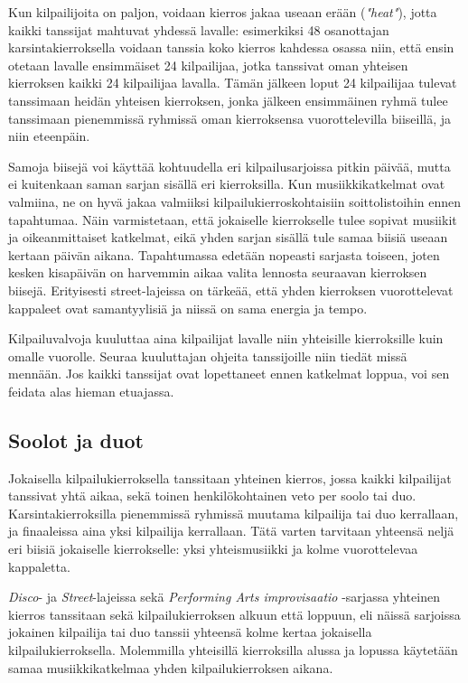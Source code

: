\documentclass[12pt, a4paper, oneside]{article}
\begin{document}
Kun kilpailijoita on paljon,
voidaan kierros jakaa useaan erään (\textit{"heat"}),
jotta kaikki tanssijat mahtuvat yhdessä lavalle: esimerkiksi 48 osanottajan karsintakierroksella voidaan tanssia koko kierros kahdessa osassa niin,
että ensin otetaan lavalle ensimmäiset 24 kilpailijaa,
jotka tanssivat oman yhteisen kierroksen kaikki 24 kilpailijaa lavalla.
Tämän jälkeen loput 24 kilpailijaa tulevat tanssimaan heidän yhteisen kierroksen,
jonka jälkeen ensimmäinen ryhmä tulee tanssimaan pienemmissä ryhmissä oman kierroksensa vuorottelevilla biiseillä,
ja niin eteenpäin.

Samoja biisejä voi käyttää kohtuudella eri kilpailusarjoissa pitkin päivää,
mutta ei kuitenkaan saman sarjan sisällä eri kierroksilla.
Kun musiikkikatkelmat ovat valmiina,
ne on hyvä jakaa valmiiksi kilpailukierroskohtaisiin soittolistoihin ennen tapahtumaa.
Näin varmistetaan,
että jokaiselle kierrokselle tulee sopivat musiikit ja oikeanmittaiset katkelmat,
eikä yhden sarjan sisällä tule samaa biisiä useaan kertaan päivän aikana.
Tapahtumassa edetään nopeasti sarjasta toiseen,
joten kesken kisapäivän on harvemmin aikaa valita lennosta seuraavan kierroksen biisejä.
Erityisesti street-lajeissa on tärkeää,
että yhden kierroksen vuorottelevat kappaleet ovat samantyylisiä ja niissä on sama energia ja tempo.

Kilpailuvalvoja kuuluttaa aina kilpailijat lavalle niin yhteisille kierroksille kuin omalle vuorolle.
Seuraa kuuluttajan ohjeita tanssijoille niin tiedät missä mennään.
Jos kaikki tanssijat ovat lopettaneet ennen katkelmat loppua,
voi sen feidata alas hieman etuajassa.

\subsection{Soolot ja duot} \label{subsec:soolot-ja-duot}

Jokaisella kilpailukierroksella tanssitaan yhteinen kierros,
jossa kaikki kilpailijat tanssivat yhtä aikaa,
sekä toinen henkilökohtainen veto per soolo tai duo.
Karsintakierroksilla pienemmissä ryhmissä muutama kilpailija tai duo kerrallaan,
ja finaaleissa aina yksi kilpailija kerrallaan.
Tätä varten tarvitaan yhteensä neljä eri biisiä jokaiselle kierrokselle:
yksi yhteismusiikki ja kolme vuorottelevaa kappaletta.

\textit{Disco}- ja \textit{Street}-lajeissa sekä \textit{Performing Arts improvisaatio} -sarjassa yhteinen kierros tanssitaan sekä kilpailukierroksen alkuun että loppuun,
eli näissä sarjoissa jokainen kilpailija tai duo tanssii yhteensä kolme kertaa jokaisella kilpailukierroksella.
Molemmilla yhteisillä kierroksilla alussa ja lopussa käytetään samaa musiikkikatkelmaa yhden kilpailukierroksen aikana.
\end{document}

